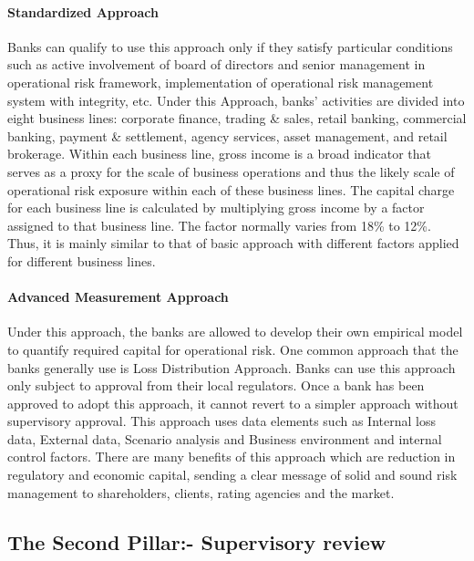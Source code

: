 \documentclass[11pt]{article}
\numberwithin{equation}{section}
\begin{document}
\paragraph{Standardized Approach}\mbox{}
\medskip

Banks can qualify to use this approach only if they satisfy particular conditions such as active involvement of board of directors and senior management in operational risk framework, implementation of operational risk management system with integrity, etc. Under this Approach, banks’ activities are divided into eight business lines: corporate finance, trading \& sales, retail banking, commercial banking, payment \& settlement, agency services, asset management, and retail brokerage. Within each business line, gross income is a broad indicator that serves as a proxy for the scale of business operations and thus the likely scale of operational risk exposure within each of these business lines. The capital charge for each business line is calculated by multiplying gross income by a factor assigned to that business line. The factor normally varies from 18\% to 12\%. Thus, it is mainly similar to that of basic approach with different factors applied for different business lines. 

\paragraph{Advanced Measurement Approach}\mbox{}
\medskip

Under this approach, the banks are allowed to develop their own empirical model to quantify required capital for operational risk. One common approach that the banks generally use is Loss Distribution Approach. Banks can use this approach only subject to approval from their local regulators. Once a bank has been approved to adopt this approach, it cannot revert to a simpler approach without supervisory approval. This approach uses data elements such as Internal loss data, External data, Scenario analysis and Business environment and internal control factors. There are many benefits of this approach which are reduction in regulatory and economic capital, sending a clear message of solid and sound risk management to shareholders, clients, rating agencies and the market.

\subsection{The Second Pillar:- Supervisory review}
\medskip
\end{document}
